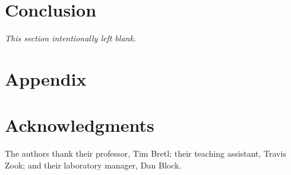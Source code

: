 \documentclass[conf]{new-aiaa}
\begin{document}
\section{Conclusion}
\textit{This section intentionally left blank.}

\newpage

\section*{Appendix}

    

\section*{Acknowledgments}

    The authors thank their professor, Tim Bretl; their teaching assistant, Travis Zook; and their laboratory manager, Dan Block.
    

\end{document}
